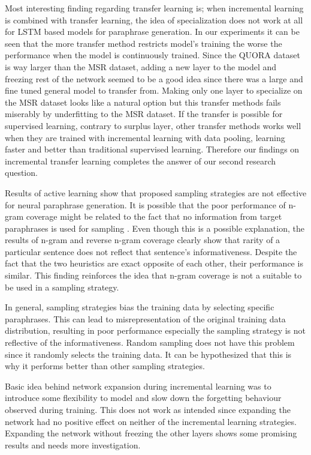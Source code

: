 Most interesting finding regarding transfer learning is; when incremental learning is combined with transfer learning, the idea of specialization does not work at all for LSTM based models for paraphrase generation. In our experiments it can be seen that the more transfer method restricts model's training the worse the performance when the model is continuously trained. Since the QUORA dataset is way larger than the MSR dataset, adding a new layer to the model and freezing rest of the network seemed to be a good idea since there was a large and fine tuned general model to transfer from. Making only one layer to specialize on the MSR dataset looks like a natural option but this transfer methods fails miserably by underfitting to the MSR dataset. If the transfer is possible for supervised learning, contrary to surplus layer, other transfer methods works well when they are trained with incremental learning with data pooling, learning faster and better than traditional supervised learning. Therefore our findings on incremental transfer learning completes the answer of our second research question.

Results of active learning show that proposed sampling strategies are not effective for neural paraphrase generation. It is possible that the poor performance of n-gram coverage might be related to the fact that no information from target paraphrases is used for sampling \cite{rubio}. Even though this is a possible explanation, the results of n-gram and reverse n-gram coverage clearly show that rarity of a particular sentence does not reflect that sentence's informativeness. Despite the fact that the two heuristics are exact opposite of each other, their performance is similar. This finding reinforces the idea that n-gram coverage is not a suitable to be used in a sampling strategy. 

In general, sampling strategies bias the training data by selecting specific paraphrases. This can lead to misrepresentation of the original training data distribution, resulting in poor performance especially the sampling strategy is not reflective of the informativeness. Random sampling does not have this problem since it randomly selects the training data. It can be hypothesized that this is why it performs better than other sampling strategies.

Basic idea behind network expansion during incremental learning was to introduce some flexibility to model and slow down the forgetting behaviour observed during training. This does not work as intended since expanding the network had no positive effect on neither of the incremental learning strategies. Expanding the network without freezing the other layers shows some promising results and needs more investigation.

